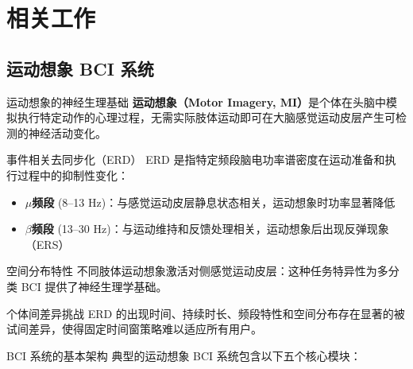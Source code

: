 \section{相关工作}

{\small

\subsection{运动想象 BCI 系统}

\begin{frame}{运动想象的神经生理基础}
    \textbf{运动想象（Motor Imagery, MI）}是个体在头脑中模拟执行特定动作的心理过程，无需实际肢体运动即可在大脑感觉运动皮层产生可检测的神经活动变化\cite{pfurtscheller1999event}。

    \begin{block}{事件相关去同步化（ERD）}
        \scriptsize
        ERD 是指特定频段脑电功率谱密度在运动准备和执行过程中的抑制性变化：
        \begin{itemize}
            \item \textbf{$\mu$频段} (8--13 Hz)：与感觉运动皮层静息状态相关，运动想象时功率显著降低
            \item \textbf{$\beta$频段} (13--30 Hz)：与运动维持和反馈处理相关，运动想象后出现反弹现象（ERS）
        \end{itemize}
    \end{block}

    \begin{block}{空间分布特性}
        \scriptsize
        不同肢体运动想象激活对侧感觉运动皮层：这种任务特异性为多分类 BCI 提供了神经生理学基础\cite{mcfarland1997spatial}。
    \end{block}

    \begin{alertblock}{个体间差异挑战}
        \scriptsize
        ERD 的出现时间、持续时长、频段特性和空间分布存在显著的被试间差异，使得固定时间窗策略难以适应所有用户\cite{lotte2011regularizing}。
    \end{alertblock}
\end{frame}

\begin{frame}{BCI 系统的基本架构}
    典型的运动想象 BCI 系统包含以下五个核心模块\cite{tangermann2012review}：
    

\end{frame}}
